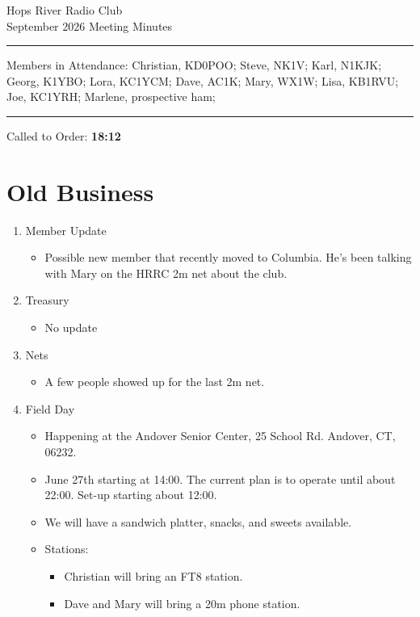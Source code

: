 \documentclass[12pt, letterpaper]{article}
\begin{document}
\begin{center}
	\huge{Hops River Radio Club}\\[10pt]
	\large{September 2026 Meeting Minutes}
\end{center}
\rule{\textwidth}{0.5pt}
	\noindent Members in Attendance: Christian, KD0POO;  Steve, NK1V;  Karl, N1KJK; Georg, K1YBO; Lora, KC1YCM; Dave, AC1K; Mary, WX1W; Lisa, KB1RVU; Joe, KC1YRH; Marlene, prospective ham; 

\rule{\textwidth}{0.5pt}

Called to Order: \textbf{18:12}

\section{Old Business}
    \begin{enumerate}
    \item Member Update
        \begin{itemize}
            \item  Possible new member that recently moved to Columbia. He's been talking with Mary on the HRRC 2m net about the club.
        \end{itemize}
    \item Treasury
        \begin{itemize}
            \item No update
        \end{itemize}
    \item Nets
        \begin{itemize}
            \item A few people showed up for the last 2m net.
        \end{itemize}
    \item Field Day
        \begin{itemize}
            \item Happening at the Andover Senior Center, 25 School Rd. Andover, CT, 06232. 
            \item June 27th starting at 14:00. The current plan is to operate until about 22:00. Set-up starting about 12:00.
            \item We will have a sandwich platter, snacks, and sweets available.
            \item Stations:
            \begin{itemize}
                \item Christian will bring an FT8 station.
                \item Dave and Mary will bring a 20m phone station. 

\end{itemize}
\end{itemize}
\end{enumerate}
\end{document}
